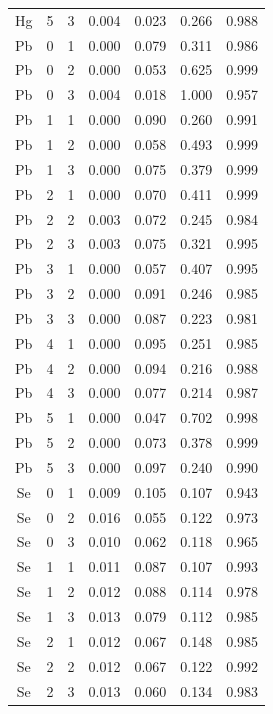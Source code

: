 \documentclass[ms, hidelinks]{uncgdissertationexp}
\theoremstyle{plain}
\theoremstyle{definition}
\theoremstyle{remark}
\begin{document}
\begin{longtable}{ccccccc}
Hg & 5 & 3 & 0.004 & 0.023 & 0.266 & 0.988\\
\rowcolor{gray!6}  Pb & 0 & 1 & 0.000 & 0.079 & 0.311 & 0.986\\
Pb & 0 & 2 & 0.000 & 0.053 & 0.625 & 0.999\\
\rowcolor{gray!6}  Pb & 0 & 3 & 0.004 & 0.018 & 1.000 & 0.957\\
Pb & 1 & 1 & 0.000 & 0.090 & 0.260 & 0.991\\
\rowcolor{gray!6}  Pb & 1 & 2 & 0.000 & 0.058 & 0.493 & 0.999\\
Pb & 1 & 3 & 0.000 & 0.075 & 0.379 & 0.999\\
\rowcolor{gray!6}  Pb & 2 & 1 & 0.000 & 0.070 & 0.411 & 0.999\\
Pb & 2 & 2 & 0.003 & 0.072 & 0.245 & 0.984\\
\rowcolor{gray!6}  Pb & 2 & 3 & 0.003 & 0.075 & 0.321 & 0.995\\
Pb & 3 & 1 & 0.000 & 0.057 & 0.407 & 0.995\\
\rowcolor{gray!6}  Pb & 3 & 2 & 0.000 & 0.091 & 0.246 & 0.985\\
Pb & 3 & 3 & 0.000 & 0.087 & 0.223 & 0.981\\
\rowcolor{gray!6}  Pb & 4 & 1 & 0.000 & 0.095 & 0.251 & 0.985\\
Pb & 4 & 2 & 0.000 & 0.094 & 0.216 & 0.988\\
\rowcolor{gray!6}  Pb & 4 & 3 & 0.000 & 0.077 & 0.214 & 0.987\\
Pb & 5 & 1 & 0.000 & 0.047 & 0.702 & 0.998\\
\rowcolor{gray!6}  Pb & 5 & 2 & 0.000 & 0.073 & 0.378 & 0.999\\
Pb & 5 & 3 & 0.000 & 0.097 & 0.240 & 0.990\\
\rowcolor{gray!6}  Se & 0 & 1 & 0.009 & 0.105 & 0.107 & 0.943\\
Se & 0 & 2 & 0.016 & 0.055 & 0.122 & 0.973\\
\rowcolor{gray!6}  Se & 0 & 3 & 0.010 & 0.062 & 0.118 & 0.965\\
Se & 1 & 1 & 0.011 & 0.087 & 0.107 & 0.993\\
\rowcolor{gray!6}  Se & 1 & 2 & 0.012 & 0.088 & 0.114 & 0.978\\
Se & 1 & 3 & 0.013 & 0.079 & 0.112 & 0.985\\
\rowcolor{gray!6}  Se & 2 & 1 & 0.012 & 0.067 & 0.148 & 0.985\\
Se & 2 & 2 & 0.012 & 0.067 & 0.122 & 0.992\\
\rowcolor{gray!6}  Se & 2 & 3 & 0.013 & 0.060 & 0.134 & 0.983\\

\end{longtable}
\end{document}
